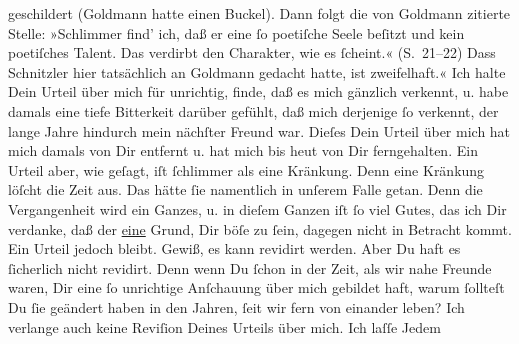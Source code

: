 \begin{ledgroupsized}[t]{13cm}
{{{                  geschildert (Goldmann hatte einen Buckel).
                  Dann folgt die von Goldmann zitierte
                  Stelle: »Schlimmer find’
                        ich, daß er eine ſo poetiſche Seele beſitzt und kein poetiſches Talent. Das
                        verdirbt den Charakter, wie es ſcheint.«
                  (S. 21–22) Dass Schnitzler hier
                  tatsächlich an Goldmann gedacht hatte, ist
                  zweifelhaft.}}}\label{K_L03478-8h}« \pend
           \pstart
           Ich halte Dein Urteil über mich für unrichtig, finde, daß es mich gänzlich verkennt,
               u. habe \strikeout{\textcolor{gray}{d}} damals eine tiefe Bitterkeit darüber gefühlt, daß mich derjenige ſo verkennt,
               der lange Jahre hindurch mein nächſter Freund war. Dieſes Dein Urteil über mich hat
               mich damals von Dir entfernt u. hat mich bis heut von Dir ferngehalten. Ein Urteil
               aber, wie geſagt, {\pb}iſt ſchlimmer als eine
               Kränkung. Denn eine Kränkung löſcht die Zeit aus. Das hätte ſie namentlich in unſerem
               Falle getan. \strikeout{\textcolor{gray}{S}} Denn die Vergangenheit wird ein Ganzes, u. in dieſem Ganzen iſt ſo viel Gutes,
               das ich Dir verdanke, daß der \uline{eine} Grund, Dir böſe zu
               ſein, dagegen nicht in Betracht kommt.\pend
           \pstart
           Ein Urteil jedoch bleibt. Gewiß, es kann revidirt werden. Aber Du haft es ſicherlich
               nicht revidirt. Denn wenn Du ſchon in der Zeit, als wir nahe Freunde waren, Dir eine
               ſo unrichtige Anſchauung über mich {\pb}gebildet
               haft, warum ſollteſt Du ſie geändert haben in den Jahren, ſeit wir fern von einander
               leben? Ich verlange auch keine Reviſion Deines Urteils über mich. Ich laſſe Jedem

\end{ledgroupsized}
